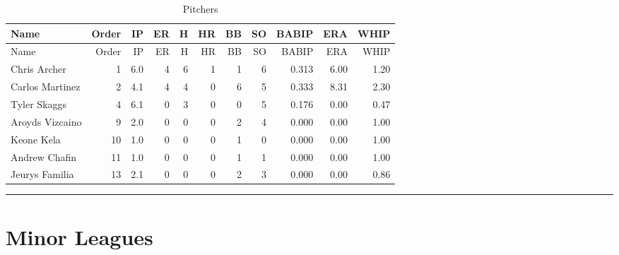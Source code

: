 \documentclass[]{article}
\begin{document}
\begin{longtable}[]{@{}lrrrrrrrrrr@{}}
\caption{Pitchers}\tabularnewline
\toprule
Name & Order & IP & ER & H & HR & BB & SO & BABIP & ERA &
WHIP\tabularnewline
\midrule
\endfirsthead
\toprule
Name & Order & IP & ER & H & HR & BB & SO & BABIP & ERA &
WHIP\tabularnewline
\midrule
\endhead
Chris Archer & 1 & 6.0 & 4 & 6 & 1 & 1 & 6 & 0.313 & 6.00 &
1.20\tabularnewline
Carlos Martinez & 2 & 4.1 & 4 & 4 & 0 & 6 & 5 & 0.333 & 8.31 &
2.30\tabularnewline
Tyler Skaggs & 4 & 6.1 & 0 & 3 & 0 & 0 & 5 & 0.176 & 0.00 &
0.47\tabularnewline
Aroyds Vizcaino & 9 & 2.0 & 0 & 0 & 0 & 2 & 4 & 0.000 & 0.00 &
1.00\tabularnewline
Keone Kela & 10 & 1.0 & 0 & 0 & 0 & 1 & 0 & 0.000 & 0.00 &
1.00\tabularnewline
Andrew Chafin & 11 & 1.0 & 0 & 0 & 0 & 1 & 1 & 0.000 & 0.00 &
1.00\tabularnewline
Jeurys Familia & 13 & 2.1 & 0 & 0 & 0 & 2 & 3 & 0.000 & 0.00 &
0.86\tabularnewline
\bottomrule
\end{longtable}

\begin{center}\rule{0.5\linewidth}{\linethickness}\end{center}

\section{Minor Leagues}\label{minor-leagues}
\end{document}
